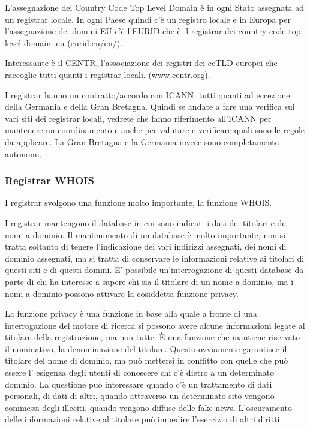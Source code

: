 L'assegnazione dei Country Code Top Level Domain è in ogni Stato assegnata ad un registrar locale. In ogni Paese quindi c'è un registro locale e in Europa per l'assegnazione dei domini EU c'è l'EURID che è il registrar dei country code top level domain .eu (eurid.eu/en/).

Interessante è il CENTR, l'associazione dei registri dei ccTLD europei che raccoglie tutti quanti i registrar locali. (www.centr.org).

I registrar hanno un contratto/accordo con ICANN, tutti quanti ad eccezione della Germania e della Gran Bretagna. Quindi se andate a fare una verifica sui vari siti dei registrar locali, vedrete che fanno riferimento all'ICANN per mantenere un coordinamento e anche per valutare e verificare quali sono le regole da applicare. La Gran Bretagna e la Germania invece sono completamente autonomi.

\subsubsection{Registrar WHOIS}
I registrar svolgono una funzione molto importante, la funzione WHOIS. 

I registrar mantengono il database in cui sono indicati i dati dei titolari e dei nomi a dominio. Il mantenimento di un database è molto importante, non si tratta soltanto di tenere l'indicazione dei vari indirizzi assegnati, dei nomi di dominio assegnati, ma si tratta di conservare le informazioni relative ai titolari di questi siti e di questi domini. E' possibile un'interrogazione di questi database da parte di chi ha interesse a sapere chi sia il titolare di un nome a dominio, ma i nomi a dominio possono attivare la cosiddetta funzione privacy. 

La funzione privacy è una funzione in base alla quale a fronte di una interrogazione del motore di ricerca si possono avere alcune informazioni legate al titolare della registrazione, ma non tutte. È una funzione che mantiene riservato il nominativo, la denominazione del titolare. Questo ovviamente garantisce il titolare del nome di dominio, ma può mettersi in conflitto con quelle che può essere l' esigenza degli utenti di conoscere chi c'è dietro a un determinato dominio. La questione può interessare quando c'è un trattamento di dati personali, di dati di altri, quando attraverso un determinato sito vengono commessi degli illeciti, quando vengono diffuse delle fake news. L'oscuramento delle informazioni relative al titolare può impedire l'esercizio di altri diritti. 


